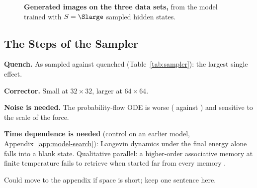 \begin{figure}[t]
  \centering
  \hfill
  \hfill
  \caption{\textbf{Generated images on the three data sets,} from the model
    trained with $S=\Slarge$ sampled hidden states. }
  \label{fig:samples}
\end{figure}

\subsection{The Steps of the Sampler}
\begin{plan}
  \item \textbf{Quench.} As sampled against quenched
        (Table~\ref{tab:sampler}): the largest single effect.
  \item \textbf{Corrector.} Small at $32\times32$, larger at $64\times64$.
  \item \textbf{Noise is needed.} The probability-flow ODE is worse
        (\FIDablExactOde{} against \FIDcelebLowExact) and sensitive to the scale
        of the force.
  \item \textbf{Time dependence is needed} (control on an earlier model,
        Appendix~\ref{app:model-search}): Langevin dynamics under the final
        energy alone falls into a blank state. Qualitative parallel: a
        higher-order associative memory at finite temperature fails to retrieve
        when started far from every memory \citep{rooke2026stochastic}.
  \item Could move to the appendix if space is short; keep one sentence here.
\end{plan}

